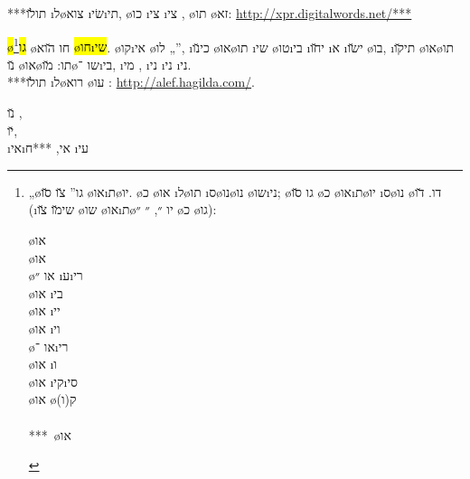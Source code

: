 ***תו\u{לו} \i{ל}\o{צוא}   \i{שׂי}\i{תי}, \o{כו} \i{צי}  \i{צי} , \o{תו} \o{זא}: \url{http://xpr.digitalwords.net/***}

 \hl{\o{גו}}\footnote{„\o{גו}”  \u{צו} \u{סו}  \o{או}\i{ת}\o{יו}. \o{כ} \o{או}  \i{ל}\o{תו} \i{ס}\o{נו}\o{נו} \o{שו}\i{ני}; \o{גו} \u{סו} \o{כ} \o{או}\i{ת}\o{יו} \i{ס}\o{נו} \o{דו}. \u{דו} (\i{שי}\u{מו}  \u{צו} \o{שו}  \o{או}\i{ת}\o{יו} ״, ״ ״ \o{כ} \o{גו}):
	\begin{multicols}{3}
		\noindent
		{\o{או} }\\
		{\o{או} }\\
		{\o{או} ״ \i{ע}\i{רי}}\\
		{\o{או} \i{בי}}\\
		{\o{או} \i{יי}}\\
		{\o{או} \i{וי}}\\
		{\o{או} ־\i{רי}}\\
		{\o{או} \i{ו}}\\
		{\o{או} \i{קי}\i{סי}}\\
		{\o{או} \o{ק(ו)}}\\
		~\\
		***~{\o{או} }
	\end{multicols}
}  \o{חו} \u{הוא} \hl{\o{חו}\i{שי}}. \o{קו}\i{אי} \o{לו} „”, \i{כי}\u{נו} \o{או}\o{תו}  \i{שי} \o{טו}\i{בי}   \i{י}\u{חו} \i{א} \i{י}\u{שו} \o{בו}, \i{תי}\u{קו} \o{או}\o{תו} \u{נו} \o{או}\o{תו}: \u{מו}\o{שו} ־\i{בי}, \i{מי} , \i{ני}  \i{ני} \i{ני}.\\
***תו\u{לו} \i{ל}\o{רוא}  \o{עו} : \url{http://alef.hagilda.com/}.

 \u{נו} ,\\
\u{יו},\\
  \i{אי}\i{אי}, ***ח  \i{עי}
